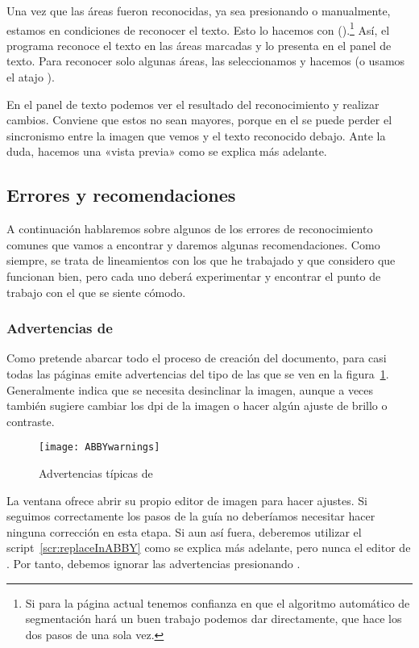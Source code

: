 \documentclass[%
	a5paper,
	10pt,
	twoside,
	openright,
	final,
]{memoir}
\begin{document}
	Una vez que las áreas fueron reconocidas, ya sea presionando  o manualmente, estamos en condiciones de reconocer el texto. Esto lo hacemos con  ().\footnote{Si para la página actual tenemos confianza en que el algoritmo automático de segmentación hará un buen trabajo podemos dar  directamente, que hace los dos pasos de una sola vez.} Así, el programa reconoce el texto en las áreas marcadas y lo presenta en el panel de texto. Para reconocer solo algunas áreas, las seleccionamos y hacemos  (o usamos el atajo ).

	En el panel de texto podemos ver el resultado del reconocimiento y realizar cambios. Conviene que estos no sean mayores, porque en el \pdf se puede perder el sincronismo entre la imagen que vemos y el texto reconocido debajo. Ante la duda, hacemos una «vista previa» como se explica más adelante.

	\subsection{Errores y recomendaciones} A continuación hablaremos sobre algunos de los errores de reconocimiento comunes que vamos a encontrar y daremos algunas recomendaciones. Como siempre, se trata de lineamientos con los que he trabajado y que considero que funcionan bien, pero cada uno deberá experimentar y encontrar el punto de trabajo con el que se siente cómodo. %

	\subsubsection{Advertencias de \abby\label{sec:ABBYwarnings}} Como \abby pretende abarcar todo el proceso de creación del documento, para casi todas las páginas emite advertencias del tipo de las que se ven en la figura~\ref{fig:ABBYwarnings}. Generalmente indica que se necesita desinclinar la imagen, aunque a veces también sugiere cambiar los dpi de la imagen o hacer algún ajuste de brillo o contraste.

	\begin{figure}
		\centering
		\texttt{[image: ABBYwarnings]}
		\caption{Advertencias típicas de \abby\label{fig:ABBYwarnings}}
	\end{figure}

	La ventana ofrece abrir su propio editor de imagen para hacer ajustes. Si seguimos correctamente los pasos de la guía no deberíamos necesitar hacer ninguna corrección en esta etapa. Si aun así fuera, deberemos utilizar el script~\ref{scr:replaceInABBY} como se explica más adelante, pero nunca el editor de \abby. Por tanto, debemos ignorar las advertencias presionando .
\end{document}
